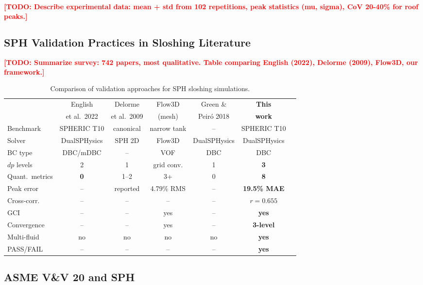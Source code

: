 \documentclass[twocolumn]{svjour3}
\newcommand{\TODO}[1]{\textcolor{red}{\textbf{[TODO: #1]}}}
\begin{document}
\TODO{Describe experimental data: mean + std from 102 repetitions, peak
statistics (mu, sigma), CoV 20-40\% for roof peaks.}

\subsection{SPH Validation Practices in Sloshing Literature}
\label{sec:lit-validation}

\TODO{Summarize survey: 742 papers, most qualitative. Table comparing
English (2022), Delorme (2009), Flow3D, our framework.}

\begin{table}[t]
\caption{Comparison of validation approaches for SPH sloshing simulations.}
\label{tab:lit-comparison}
\centering
\small
\begin{tabular}{@{}lcccccc@{}}
\toprule
& English & Delorme & Flow3D & Green \& & \textbf{This} \\
& et al.\ 2022 & et al.\ 2009 & (mesh) & Peir\'o 2018 & \textbf{work} \\
\midrule
Benchmark & SPHERIC T10 & canonical & narrow tank & -- & SPHERIC T10 \\
Solver & DualSPHysics & SPH 2D & Flow3D & DualSPHysics & DualSPHysics \\
BC type & DBC/mDBC & -- & VOF & DBC & DBC \\
$dp$ levels & 2 & 1 & grid conv. & 1 & \textbf{3} \\
Quant.\ metrics & \textbf{0} & 1--2 & 3+ & 0 & \textbf{8} \\
Peak error & -- & reported & 4.79\% RMS & -- & \textbf{19.5\% MAE} \\
Cross-corr. & -- & -- & -- & -- & \textbf{$r=0.655$} \\
GCI & -- & -- & yes & -- & \textbf{yes} \\
Convergence & -- & -- & yes & -- & \textbf{3-level} \\
Multi-fluid & no & no & no & no & \textbf{yes} \\
PASS/FAIL & -- & -- & -- & -- & \textbf{yes} \\
\bottomrule
\end{tabular}
\end{table}

\subsection{ASME V\&V 20 and SPH}
\label{sec:vv20}
\end{document}
